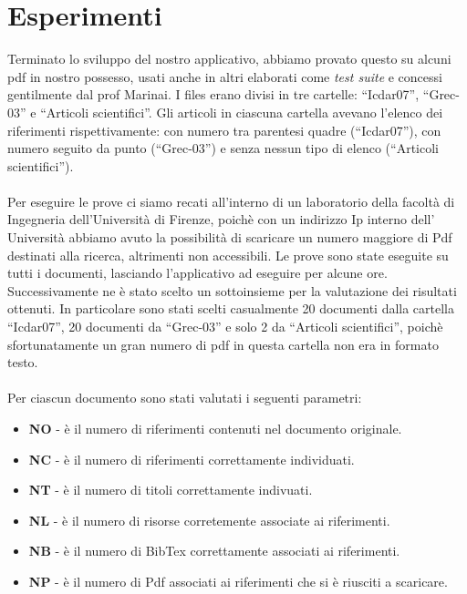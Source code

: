 \section{Esperimenti} \label{esperimenti}
Terminato lo sviluppo del nostro applicativo, abbiamo provato questo su alcuni pdf in nostro possesso, usati anche in altri elaborati come \textit{test suite} e concessi gentilmente dal prof Marinai.  I files erano divisi in tre cartelle: ``Icdar07'', ``Grec-03'' e ``Articoli scientifici''. Gli articoli in ciascuna cartella avevano l'elenco dei riferimenti rispettivamente: con numero tra parentesi quadre (``Icdar07''), con numero seguito da punto (``Grec-03'') e senza nessun tipo di elenco (``Articoli scientifici''). 
\\~\\
Per eseguire le prove ci siamo recati all'interno di un laboratorio della facoltà di Ingegneria dell'Università di Firenze, poichè con un indirizzo Ip interno dell' Università abbiamo avuto la possibilità di scaricare un numero maggiore di Pdf destinati alla ricerca, altrimenti non accessibili.
Le prove sono state eseguite su tutti i documenti, lasciando l'applicativo ad eseguire per alcune ore. Successivamente ne è stato scelto un sottoinsieme per la valutazione dei risultati ottenuti. In particolare sono stati scelti casualmente 20 documenti dalla cartella ``Icdar07'', 20 documenti da ``Grec-03'' e solo 2 da ``Articoli scientifici'', poichè sfortunatamente un gran numero di pdf in questa cartella non era in formato testo.
\\~\\
Per ciascun documento sono stati valutati i seguenti parametri:
\begin{itemize}
 \item \textbf{NO} - è il numero di riferimenti contenuti nel documento originale.
 \item \textbf{NC} - è il numero di riferimenti correttamente individuati. 
 \item \textbf{NT} - è il numero di titoli correttamente indivuati.
 \item \textbf{NL} - è il numero di risorse corretemente associate ai riferimenti.
 \item \textbf{NB} - è il numero di BibTex correttamente associati ai riferimenti.
 \item \textbf{NP} - è il numero di Pdf associati ai riferimenti che si è riusciti a scaricare. 
\end{itemize}

